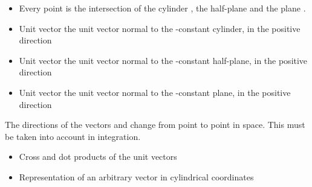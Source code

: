 \begin{ELunit}


\begin{itemize}
\tightlist
\item
  Every point  is the intersection of the cylinder , the half-plane  and the plane .
\item
  Unit vector  \ELim{\ELto} the unit vector normal to the -constant cylinder, in the positive direction
\item
  Unit vector \ELim{\uvec{\phi}} \ELim{\ELto} the unit vector normal to the \ELim{\phi}-constant half-plane, in the positive direction
\item
  Unit vector  \ELim{\ELto} the unit vector normal to the -constant plane, in the positive direction
\end{itemize}

\end{ELunit}

\begin{ELremark}{}

The directions of the vectors  and \ELim{\uvec{\phi}} change from point to point in space. This must be taken into account in integration.

\end{ELremark}

\begin{ELunit}

\begin{itemize}
\tightlist
\item
  Cross and dot products of the unit vectors
\end{itemize}




\end{ELunit}

\begin{ELjoin}

\begin{itemize}
\tightlist
\item
  Representation of an arbitrary vector  in cylindrical coordinates
\end{itemize}

\begin{ELimportant}{}


\end{ELimportant}

\end{ELjoin}

